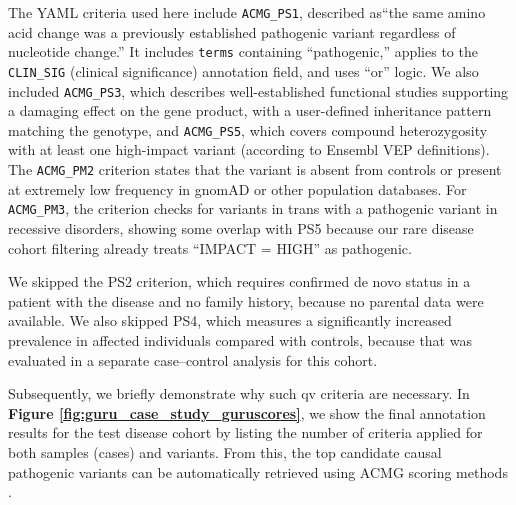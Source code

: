 The YAML criteria used here include \texttt{ACMG\_PS1}, described as``the same amino acid change was a previously established pathogenic variant regardless of nucleotide change.'' It includes \texttt{terms} containing ``pathogenic,'' applies to the \texttt{CLIN\_SIG} (clinical significance) annotation field, and uses ``or'' logic. We also included \texttt{ACMG\_PS3}, which describes well-established functional studies supporting a damaging effect on the gene product, with a user-defined inheritance pattern matching the genotype, and \texttt{ACMG\_PS5}, which covers compound heterozygosity with at least one high-impact variant (according to Ensembl VEP definitions). The \texttt{ACMG\_PM2} criterion states that the variant is absent from controls or present at extremely low frequency in gnomAD or other population databases. For \texttt{ACMG\_PM3}, the criterion checks for variants in trans with a pathogenic variant in recessive disorders, showing some overlap with PS5 because our rare disease cohort filtering already treats ``IMPACT = HIGH'' as pathogenic.

We skipped the PS2 criterion, which requires confirmed de novo status in a patient with the disease and no family history, because no parental data were available. We also skipped PS4, which measures a significantly increased prevalence in affected individuals compared with controls, because that was evaluated in a separate case–control analysis for this cohort.

Subsequently, we briefly demonstrate why such \ac{qv} criteria are necessary. In \textbf{Figure \ref{fig:guru_case_study_guruscores}}, we show the final annotation results for the test disease cohort by listing the number of criteria applied for both samples (cases) and variants. From this, the top candidate causal pathogenic variants can be automatically retrieved using ACMG scoring methods \cite{richards2015standards, tavtigian2020fitting}.

